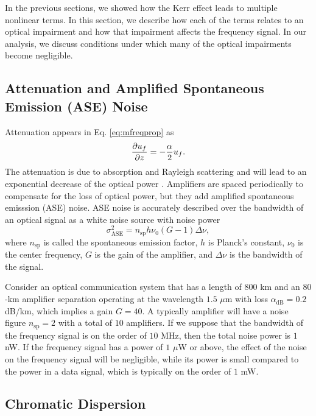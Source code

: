 In the previous sections, we showed how the Kerr effect leads to multiple nonlinear terms. In this section, we describe how each of the terms relates to an optical impairment and how that impairment affects the frequency signal. In our analysis, we discuss conditions under which many of the optical impairments become negligible.

\subsection{Attenuation and Amplified Spontaneous Emission (ASE) Noise}
%
Attenuation appears in Eq. \ref{eq:mfreqprop} as
%
\begin{equation}
\frac{\partial u_f}{\partial z} = -\frac{\alpha}{2}u_f.
\end{equation}
%
The attenuation is due to absorption and Rayleigh scattering and will lead to an exponential decrease of the optical power \cite{agrawal2012fiber}. Amplifiers are spaced periodically to compensate for the loss of optical power, but they add amplified spontaneous emisssion (ASE) noise. ASE noise is accurately described over the bandwidth of an optical signal as a white noise source with noise power \cite{agrawal2012fiber}
%
\begin{equation}
\sigma^2_{\text{ASE}} = n_{\text{sp}}h\nu_0 (G-1)\Delta\nu,
\end{equation}
%
where $n_{\text{sp}}$ is called the spontaneous emission factor, $h$ is Planck's constant, $\nu_0$ is the center frequency, $G$ is the gain of the amplifier, and $\Delta\nu$ is the bandwidth of the signal. 

Consider an optical communication system that has a length of $800$ km and an $80$-km amplifier separation operating at the wavelength $1.5$ $\mu$m with loss $\alpha_{\text{dB}} = 0.2$ dB/km, which implies a gain $G=40$. A typically amplifier will have a noise figure $n_{\text{sp}} = 2$ with a total of $10$ amplifiers. If we suppose that the bandwidth of the frequency signal is on the order of $10$ MHz, then the total noise power is $1$ nW. If the frequency signal has a power of $1$ $\mu$W or above, the effect of the noise on the frequency signal will be negligible, while its power is small compared to the power in a data signal, which is typically on the order of $1$ mW.

\subsection{Chromatic Dispersion}

